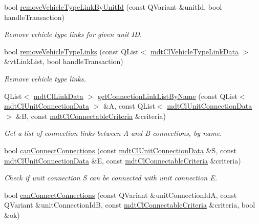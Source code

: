\begin{DoxyCompactItemize}
bool \hyperlink{classmdt_cl_link_a44d152cef5aeb95a150335b225276892}{remove\-Vehicle\-Type\-Link\-By\-Unit\-Id} (const Q\-Variant \&unit\-Id, bool handle\-Transaction)
\begin{DoxyCompactList}\small\item\em Remove vehicle type links for given unit I\-D. \end{DoxyCompactList}\item 
bool \hyperlink{classmdt_cl_link_a6b3e1de445d4c70c057ff89df193854f}{remove\-Vehicle\-Type\-Links} (const Q\-List$<$ \hyperlink{classmdt_cl_vehicle_type_link_data}{mdt\-Cl\-Vehicle\-Type\-Link\-Data} $>$ \&vt\-Link\-List, bool handle\-Transaction)
\begin{DoxyCompactList}\small\item\em Remove vehicle type links. \end{DoxyCompactList}\item 
Q\-List$<$ \hyperlink{classmdt_cl_link_data}{mdt\-Cl\-Link\-Data} $>$ \hyperlink{classmdt_cl_link_ac374f58db18fb9e1d92faeab6265362c}{get\-Connection\-Link\-List\-By\-Name} (const Q\-List$<$ \hyperlink{classmdt_cl_unit_connection_data}{mdt\-Cl\-Unit\-Connection\-Data} $>$ \&A, const Q\-List$<$ \hyperlink{classmdt_cl_unit_connection_data}{mdt\-Cl\-Unit\-Connection\-Data} $>$ \&B, const \hyperlink{structmdt_cl_connectable_criteria}{mdt\-Cl\-Connectable\-Criteria} \&criteria)
\begin{DoxyCompactList}\small\item\em Get a list of connection links between A and B connections, by name. \end{DoxyCompactList}\item 
bool \hyperlink{classmdt_cl_link_a24712969653352c7f3a926184a717b8b}{can\-Connect\-Connections} (const \hyperlink{classmdt_cl_unit_connection_data}{mdt\-Cl\-Unit\-Connection\-Data} \&S, const \hyperlink{classmdt_cl_unit_connection_data}{mdt\-Cl\-Unit\-Connection\-Data} \&E, const \hyperlink{structmdt_cl_connectable_criteria}{mdt\-Cl\-Connectable\-Criteria} \&criteria)
\begin{DoxyCompactList}\small\item\em Check if unit connection S can be connected with unit connection E. \end{DoxyCompactList}\item 
bool \hyperlink{classmdt_cl_link_ab8a4334aa14aa41686a240d3ae34577b}{can\-Connect\-Connections} (const Q\-Variant \&unit\-Connection\-Id\-A, const Q\-Variant \&unit\-Connection\-Id\-B, const \hyperlink{structmdt_cl_connectable_criteria}{mdt\-Cl\-Connectable\-Criteria} \&criteria, bool \&ok)

\end{DoxyCompactItemize}
